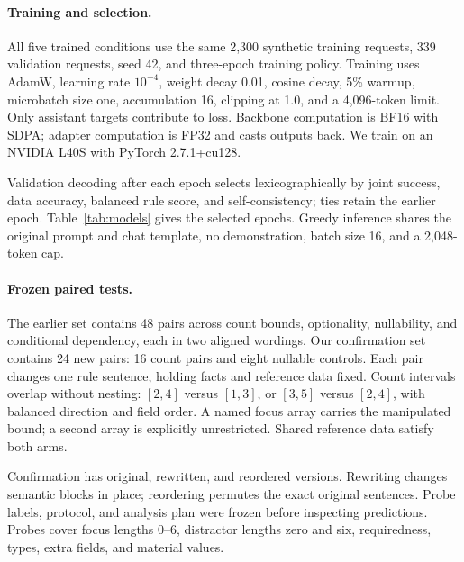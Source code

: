 \paragraph{Training and selection.}
All five trained conditions use the same 2,300 synthetic training requests, 339 validation requests, seed 42, and three-epoch training policy. Training uses AdamW, learning rate $10^{-4}$, weight decay 0.01, cosine decay, 5\% warmup, microbatch size one, accumulation 16, clipping at 1.0, and a 4,096-token limit. Only assistant targets contribute to loss. Backbone computation is BF16 with SDPA; adapter computation is FP32 and casts outputs back. We train on an NVIDIA L40S with PyTorch 2.7.1+cu128.

Validation decoding after each epoch selects lexicographically by joint success, data accuracy, balanced rule score, and self-consistency; ties retain the earlier epoch. Table~\ref{tab:models} gives the selected epochs. Greedy inference shares the original prompt and chat template, no demonstration, batch size 16, and a 2,048-token cap.

\paragraph{Frozen paired tests.}
The earlier set contains 48 pairs across count bounds, optionality, nullability, and conditional dependency, each in two aligned wordings. Our confirmation set contains 24 new pairs: 16 count pairs and eight nullable controls. Each pair changes one rule sentence, holding facts and reference data fixed. Count intervals overlap without nesting: $[2,4]$ versus $[1,3]$, or $[3,5]$ versus $[2,4]$, with balanced direction and field order. A named focus array carries the manipulated bound; a second array is explicitly unrestricted. Shared reference data satisfy both arms.

Confirmation has original, rewritten, and reordered versions. Rewriting changes semantic blocks in place; reordering permutes the exact original sentences. Probe labels, protocol, and analysis plan were frozen before inspecting predictions. Probes cover focus lengths 0--6, distractor lengths zero and six, requiredness, types, extra fields, and material values.

